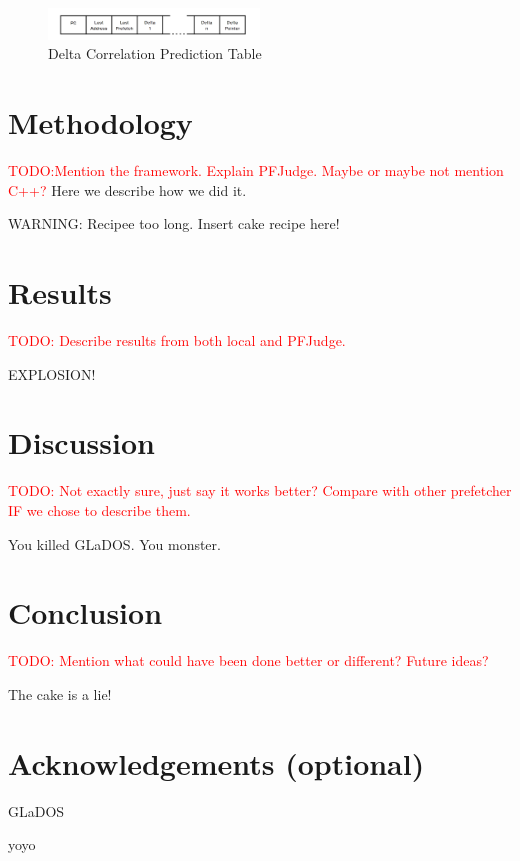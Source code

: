 \documentclass[a4paper]{IEEEtran}
\newcommand\TODO[1]{\textcolor{red}{TODO:#1}}
\newcommand\todo[1]{\TODO{#1}}
\begin{document}
\begin{figure}[h!]
  \centering
      \includegraphics[width=0.5\textwidth]{Figures/DCTable}
  \caption{Delta Correlation Prediction Table}
  \label{fig:DCTable}
\end{figure}

\section{Methodology}

\todo{Mention the framework. Explain PFJudge. Maybe or maybe not mention C++?}
Here we describe how we did it.

WARNING: Recipee too long. Insert cake recipe here!

\section{Results}

\todo{ Describe results from both local and PFJudge.}



EXPLOSION!

\section{Discussion}

\todo{ Not exactly sure, just say it works better? Compare with other prefetcher IF we chose to describe them. }

You killed GLaDOS.
You monster.

\section{Conclusion}

\todo{ Mention what could have been done better or different? Future ideas? }

The cake is a lie!

\section{Acknowledgements (optional)}

GLaDOS

yoyo \cite{assignment-text}



\nocite{*}
\end{document}
